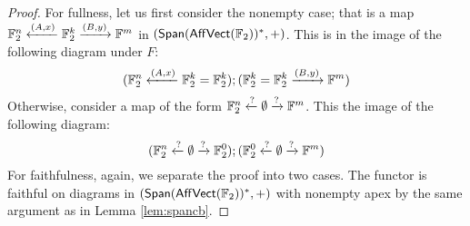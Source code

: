 \begin{proof}
For fullness, let us first consider the nonempty case; that is a map $\mathbb{F}_2^n \xleftarrow{(A,x)} \mathbb{F}_2^k \xrightarrow{(B,y)}\mathbb{F}^m$ in $(\mathsf{Span}(\mathsf{Aff}\mathsf{Vect}(\mathbb{F}_2))^*,+)$.  This is in the image of the following diagram under $F$:
$$
(\mathbb{F}_2^n \xleftarrow{(A,x)} \mathbb{F}_2^k  = \mathbb{F}_2^k); (\mathbb{F}_2^k = \mathbb{F}_2^k  \xrightarrow{(B,y)}\mathbb{F}^m)
$$ 
Otherwise, consider a map of the form  $\mathbb{F}_2^n \xleftarrow{?} \emptyset  \xrightarrow{?}\mathbb{F}^m$.  This the image of the following diagram:
$$
(\mathbb{F}_2^n \xleftarrow{?} \emptyset \xrightarrow {?} \mathbb{F}_2^0  );(\mathbb{F}_2^0 \xleftarrow{?} \emptyset  \xrightarrow{?}\mathbb{F}^m)
$$
For faithfulness, again, we separate the proof into two cases.  The functor is faithful on diagrams in $(\mathsf{Span}(\mathsf{Aff}\mathsf{Vect}(\mathbb{F}_2))^*,+)$ with nonempty apex by the same argument as in Lemma \ref{lem:spancb}.

\end{proof}
